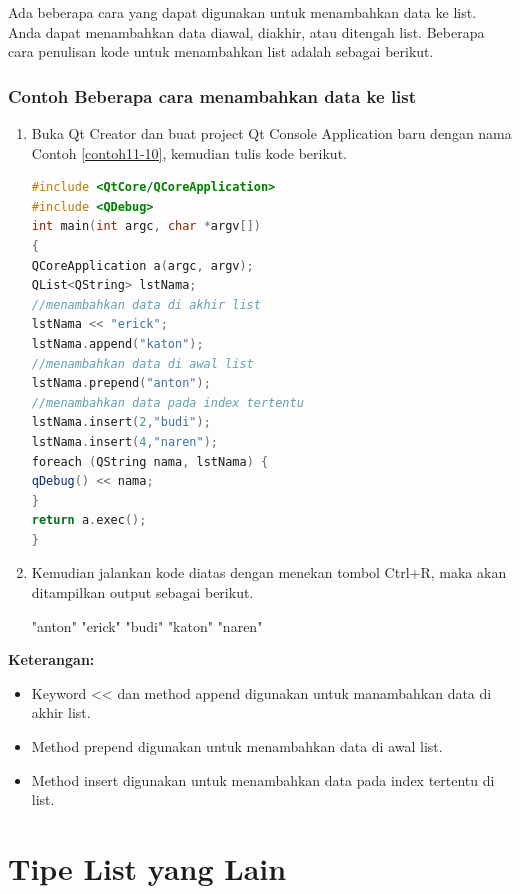 Ada beberapa cara yang dapat digunakan untuk menambahkan data ke list.
Anda dapat menambahkan data diawal, diakhir, atau ditengah list.
Beberapa cara penulisan kode untuk menambahkan list adalah sebagai
berikut.

\subsubsection*{Contoh Beberapa cara menambahkan data ke list}

\begin{enumerate}

\item
  Buka Qt Creator dan buat project Qt Console Application baru dengan
  nama Contoh \ref{contoh11-10}, kemudian tulis kode berikut.

\begin{lstlisting}[language=c++, caption= Beberapa cara menambahkan data ke list, label=contoh11-10]
#include <QtCore/QCoreApplication>
#include <QDebug>
int main(int argc, char *argv[])
{
QCoreApplication a(argc, argv);
QList<QString> lstNama;
//menambahkan data di akhir list
lstNama << "erick";
lstNama.append("katon");
//menambahkan data di awal list
lstNama.prepend("anton");
//menambahkan data pada index tertentu
lstNama.insert(2,"budi");
lstNama.insert(4,"naren");
foreach (QString nama, lstNama) {
qDebug() << nama;
}
return a.exec();
}
\end{lstlisting}
\item
  Kemudian jalankan kode diatas dengan menekan tombol Ctrl+R, maka akan
  ditampilkan output sebagai berikut.

\begin{lcverbatim}
"anton"
"erick"
"budi"
"katon"
"naren"
\end{lcverbatim}
\end{enumerate}

\textbf{Keterangan:}

\begin{itemize}

\item
  Keyword \textless{}\textless{} dan method append digunakan untuk
  manambahkan data di akhir list.
\item
  Method prepend digunakan untuk menambahkan data di awal list.
\item
  Method insert digunakan untuk menambahkan data pada index tertentu di
  list.
\end{itemize}

\section{Tipe List yang Lain}\label{tipe-list-yang-lain}


